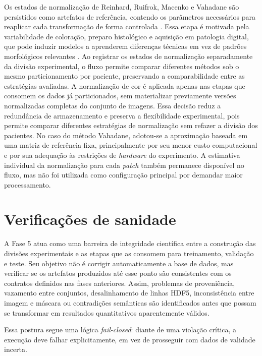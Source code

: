 Os estados de normalização de Reinhard, Ruifrok, Macenko e Vahadane são persistidos como artefatos de referência, contendo os parâmetros necessários para reaplicar cada transformação de forma controlada \cite{reinhard2001color,ruifrok2001quantification,macenko2009method,vahadane2016structure}. Essa etapa é motivada pela variabilidade de coloração, preparo histológico e aquisição em patologia digital, que pode induzir modelos a aprenderem diferenças técnicas em vez de padrões morfológicos relevantes \cite{tellez2019augmentation,duenweg2023scanner}. Ao registrar os estados de normalização separadamente da divisão experimental, o fluxo permite comparar diferentes métodos sob o mesmo particionamento por paciente, preservando a comparabilidade entre as estratégias avaliadas. A normalização de cor é aplicada apenas nas etapas que consomem os dados já particionados, sem materializar previamente versões normalizadas completas do conjunto de imagens. Essa decisão reduz a redundância de armazenamento e preserva a flexibilidade experimental, pois permite comparar diferentes estratégias de normalização sem refazer a divisão dos pacientes. No caso do método Vahadane, adotou-se a aproximação baseada em uma matriz de referência fixa, principalmente por seu menor custo computacional e por sua adequação às restrições de \textit{hardware} do experimento. A estimativa individual da normalização para cada \textit{patch} também permanece disponível no fluxo, mas não foi utilizada como configuração principal por demandar maior processamento.

\section{Verificações de sanidade}\label{sec:met_sanidade}

A Fase 5 atua como uma barreira de integridade científica entre a construção das
divisões experimentais e as etapas que as consomem para treinamento, validação e
teste. Seu objetivo não é corrigir automaticamente a base de dados, mas verificar
se os artefatos produzidos até esse ponto são consistentes com os contratos
definidos nas fases anteriores. Assim, problemas de proveniência, vazamento entre
conjuntos, desalinhamento de linhas HDF5, inconsistência entre imagem e máscara
ou contradições semânticas são identificados antes que possam se transformar em
resultados quantitativos aparentemente válidos.

Essa postura segue uma lógica \textit{fail-closed}: diante de uma violação
crítica, a execução deve falhar explicitamente, em vez de prosseguir com dados de
validade incerta.

